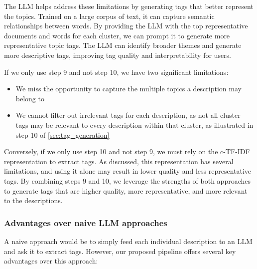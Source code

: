 The LLM helps address these limitations by generating tags that better represent the topics. Trained on a large corpus of text, it can capture semantic relationships between words. By providing the LLM with the top representative documents and words for each cluster, we can prompt it to generate more representative topic tags. The LLM can identify broader themes and generate more descriptive tags, improving tag quality and interpretability for users.

If we only use step 9 and not step 10, we have two significant limitations:
\begin{itemize}
    \item We miss the opportunity to capture the multiple topics a description may belong to
    \item We cannot filter out irrelevant tags for each description, as not all cluster tags may be relevant to every description within that cluster, as illustrated in step 10 of \cref{sec:tag_generation}
\end{itemize}

Conversely, if we only use step 10 and not step 9, we must rely on the c-TF-IDF representation to extract tags. As discussed, this representation has several limitations, and using it alone may result in lower quality and less representative tags. By combining steps 9 and 10, we leverage the strengths of both approaches to generate tags that are higher quality, more representative, and more relevant to the descriptions.

\subsubsection{Advantages over naive LLM approaches}
A naive approach would be to simply feed each individual description to an LLM and ask it to extract tags. However, our proposed pipeline offers several key advantages over this approach:

